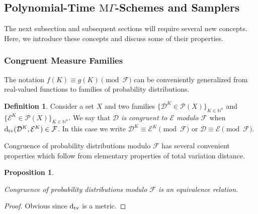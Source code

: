 \documentclass[11pt]{article}
\numberwithin{equation}{section}
\theoremstyle{definition}
\newtheorem{definition}{Definition}[section]
\theoremstyle{plain}
\newtheorem{proposition}{Proposition}[section]
\newcommand{\Dtv}{\operatorname{d}_{\textnormal{tv}}}
\newcommand{\Nats}{\mathbb{N}}
\newcommand{\Dist}{\mathcal{D}}
\newcommand{\MGrow}{\mathrm{M}\Gamma}
\newcommand{\Fall}{\mathcal{F}}
\begin{document}
\subsection{Polynomial-Time \texorpdfstring{$\MGrow$}{MΓ}-Schemes and Samplers}

The next subsection and subsequent sections will require several new concepts. Here, we introduce these concepts and discuss some of their properties.

\subsubsection{Congruent Measure Families}

The notation $f(K) \equiv g(K) \pmod \Fall$ can be conveniently generalized from real-valued functions to families of probability distributions.

\begin{samepage}
\begin{definition}

Consider a set $X$ and two families $\{\Dist^K \in \mathcal{P}(X)\}_{K \in \Nats^n}$ and $\{\mathcal{E}^K \in \mathcal{P}(X)\}_{K \in \Nats^n}$. We say that \emph{$\Dist$ is congruent to $\mathcal{E}$ modulo $\Fall$} when $\Dtv(\Dist^K,\mathcal{E}^K) \in \Fall$. In this case we write ${\Dist^K \equiv \mathcal{E}^K \pmod \Fall}$ or $\Dist \equiv \mathcal{E} \pmod \Fall$.

\end{definition}
\end{samepage}

Congruence of probability distributions modulo $\Fall$ has several convenient properties which follow from elementary properties of total variation distance.

\begin{samepage}
\begin{proposition}
\label{prp:prob_cong_eq}

Congruence of probability distributions modulo $\Fall$ is an equivalence relation.

\end{proposition}
\end{samepage}

\begin{proof}

Obvious since $\Dtv$ is a metric.
\end{proof}
\end{document}
